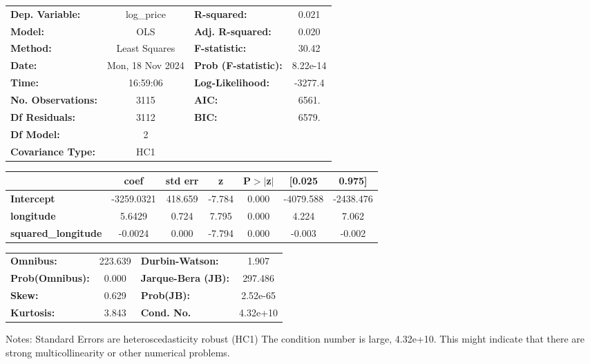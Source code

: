 \begin{center}
\begin{tabular}{lclc}
\toprule
\textbf{Dep. Variable:}     &    log\_price    & \textbf{  R-squared:         } &     0.021   \\
\textbf{Model:}             &       OLS        & \textbf{  Adj. R-squared:    } &     0.020   \\
\textbf{Method:}            &  Least Squares   & \textbf{  F-statistic:       } &     30.42   \\
\textbf{Date:}              & Mon, 18 Nov 2024 & \textbf{  Prob (F-statistic):} &  8.22e-14   \\
\textbf{Time:}              &     16:59:06     & \textbf{  Log-Likelihood:    } &   -3277.4   \\
\textbf{No. Observations:}  &        3115      & \textbf{  AIC:               } &     6561.   \\
\textbf{Df Residuals:}      &        3112      & \textbf{  BIC:               } &     6579.   \\
\textbf{Df Model:}          &           2      & \textbf{                     } &             \\
\textbf{Covariance Type:}   &       HC1        & \textbf{                     } &             \\
\bottomrule
\end{tabular}
\begin{tabular}{lcccccc}
                            & \textbf{coef} & \textbf{std err} & \textbf{z} & \textbf{P$> |$z$|$} & \textbf{[0.025} & \textbf{0.975]}  \\
\midrule
\textbf{Intercept}          &   -3259.0321  &      418.659     &    -7.784  &         0.000        &    -4079.588    &    -2438.476     \\
\textbf{longitude}          &       5.6429  &        0.724     &     7.795  &         0.000        &        4.224    &        7.062     \\
\textbf{squared\_longitude} &      -0.0024  &        0.000     &    -7.794  &         0.000        &       -0.003    &       -0.002     \\
\bottomrule
\end{tabular}
\begin{tabular}{lclc}
\textbf{Omnibus:}       & 223.639 & \textbf{  Durbin-Watson:     } &    1.907  \\
\textbf{Prob(Omnibus):} &   0.000 & \textbf{  Jarque-Bera (JB):  } &  297.486  \\
\textbf{Skew:}          &   0.629 & \textbf{  Prob(JB):          } & 2.52e-65  \\
\textbf{Kurtosis:}      &   3.843 & \textbf{  Cond. No.          } & 4.32e+10  \\
\bottomrule
\end{tabular}
\end{center}

Notes: \newline
 [1] Standard Errors are heteroscedasticity robust (HC1) \newline
 [2] The condition number is large, 4.32e+10. This might indicate that there are \newline
 strong multicollinearity or other numerical problems.
